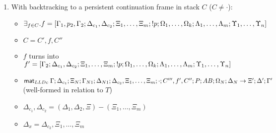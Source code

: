 {\begin{lemma}
\begin{enumerate}
\begin{enumerate}
       \begin{itemize}
         \item $\exists_{f \in C}. f = (\Delta_a; \Delta_{b_1}, p_2,
               \Delta_{b_2}; p; \Xi_1, \dotsc, \Xi_m; \Omega_1, \dotsc,
               \Omega_k; \Lambda_1, \dotsc, \Lambda_m; \Upsilon_1, \dotsc, \Upsilon_n)$
         \item $C = C', f, C''$
         \item $f$ turns into $f' = (\Delta_a, \Delta_{b_1}, p_2; \Delta_{b_2};
               p; \Xi_1, \dotsc, \Xi_m; \Omega_1, \dotsc, \Omega_k; \Lambda_1,
               \dotsc, \Lambda_m; \Upsilon_1, \dotsc, \Upsilon_n)$
         \item $\mc \Gamma; \Delta_c; \Xi_N; \Gamma_{N1}; \Delta_{N1}; \Xi_1,
            \dotsc, \Xi_m, p_2, \Xi_c; \cdot; C''', f', C''; P; AB;
         \Omega_N; \Delta_N \rightarrow \Xi'; \Delta'; \Gamma'$ (well-formed in
               relation to $T$)
         \item $\Delta_c = (\Delta_1, \Delta_2, \Xi) - (\Xi_1, \dotsc, \Xi_m, p_2, \Xi_c)$
      \end{itemize}
      
      \item With backtracking to a persistent continuation frame in stack $C$
      ($C \neq \cdot$):

      \begin{itemize}
         \item $\exists_{f \in C}. f = [\Gamma_1, p_2, \Gamma_2; \Delta_{c_1},
         \Delta_{c_2}; \Xi_1, \dotsc, \Xi_m; {!} p; \Omega_1, \dotsc,
         \Omega_k; \Lambda_1, \dotsc, \Lambda_m; \Upsilon_1, \dotsc, \Upsilon_n]$
         \item $C = C', f, C''$
         \item $f$ turns into $f' = [\Gamma_2; \Delta_{c_1}, \Delta_{c_2};
         \Xi_1, \dotsc, \Xi_m; {!} p; \Omega_1, \dotsc, \Omega_k; \Lambda_1,
         \dotsc, \Lambda_m; \Upsilon_1, \dotsc, \Upsilon_n]$
         \item $\mathsf{mat}_{LLDc} \; \Gamma; \Delta_{c_1}; \Xi_N; \Gamma_{N1}; \Delta_{N1};
            \Delta_{c_2}, \Xi_1, \dotsc, \Xi_m; \cdot; C''', f', C''; P;
            AB; \Omega_N; \Delta_N \rightarrow \Xi'; \Delta'; \Gamma'$ (well-formed in relation to $T$)
         \item $\Delta_{c_1}, \Delta_{c_2} = (\Delta_1, \Delta_2, \Xi) - (\Xi_1,
               \dotsc, \Xi_m)$
         \item $\Delta_x = \Delta_{c_2}, \Xi_1, \dotsc, \Xi_m$
      \end{itemize}
      

\end{enumerate}
\end{enumerate}
\end{lemma}}
